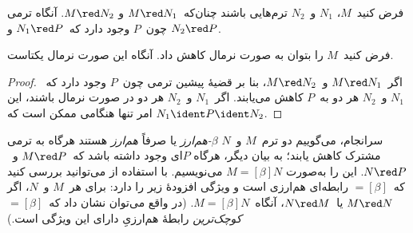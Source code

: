 \documentclass[../../../include/open-logic-section]{subfiles}
\begin{document}

\begin{thm}
فرض کنید~$M$، $N_1$ و~$N_2$ ترم‌هایی باشند چنان‌که~$M \red N_1$ و
$M \red N_2$. آنگاه ترمی چون~$P$ وجود دارد که~$N_1 \red P$ و
$N_2 \red P$.
\end{thm}

\begin{cor}
فرض کنید~$M$ را بتوان به صورت نرمال کاهش داد. آنگاه این صورت نرمال
یکتاست.
\end{cor}

\begin{proof}
اگر~$M \red N_1$ و~$M \red N_2$، بنا بر قضیهٔ پیشین ترمی چون~$P$ وجود
دارد که~$N_1$ و~$N_2$ هر دو به~$P$ کاهش می‌یابند. اگر~$N_1$ و~$N_2$ هر
دو در صورت نرمال باشند، این امر تنها هنگامی ممکن است که
$N_1 \ident P \ident N_2$.
\end{proof}

سرانجام، می‌گوییم دو ترم~$M$ و~$N$ \emph{$\beta$-هم‌ارز} یا صرفاً
\emph{هم‌ارز} هستند هرگاه به ترمی مشترک کاهش یابند؛ به بیان دیگر، هرگاه
$P$ای وجود داشته باشد که~$M \red P$ و~$N \red P$. این را به‌صورت
$M \equal[\beta] N$ می‌نویسیم. با استفاده از
 می‌توانید بررسی کنید که~$\equal[\beta]$ رابطه‌ای
هم‌ارزی است و ویژگی افزودهٔ زیر را دارد: برای هر~$M$ و~$N$، اگر
$M \red N$ یا~$N \red M$، آنگاه~$M \equal[\beta] N$. (در واقع می‌توان
نشان داد که~$\equal[\beta]$ \emph{کوچک‌ترین} رابطهٔ هم‌ارزیِ دارای این
ویژگی است.)
\end{document}
